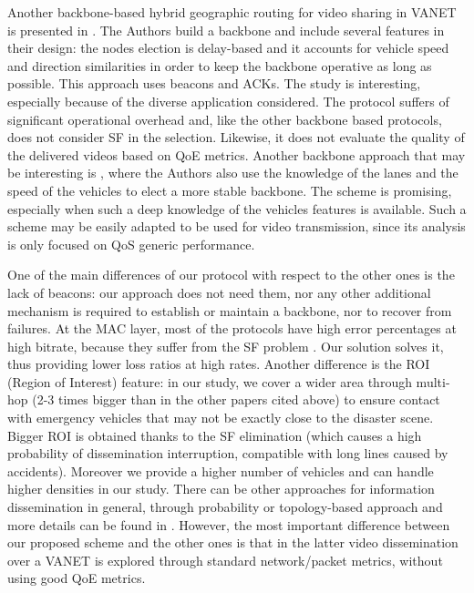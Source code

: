 \documentclass{acm_proc_article-sp}
\begin{document}
Another backbone-based hybrid geographic routing for video sharing in VANET is presented in \cite{VideoBackboneDiFelice}. The Authors build a backbone and include several features in their design: the nodes election is delay-based and it accounts for vehicle speed and direction similarities in order to keep the backbone operative as long as possible. This approach uses beacons and ACKs. The study is interesting, especially because of the diverse application considered. The protocol suffers of significant operational overhead and, like the other backbone based protocols, does not consider SF in the selection.  Likewise, it does not evaluate the quality of the delivered videos based on QoE metrics.
Another backbone approach that may be interesting is \cite{medhocrubin}, where the Authors also use the knowledge of the lanes and the speed of the vehicles to elect a more stable backbone. The scheme is promising, especially when such a deep knowledge of the vehicles features is available. Such a scheme may be easily adapted to be used for video transmission, since its analysis is only focused on QoS generic performance.

One of the main differences of our protocol with respect to the other ones is the lack of beacons: our approach does not need them, nor any other additional mechanism is required to establish or maintain a backbone, nor to recover from failures.
At the MAC layer, most of the protocols have high error percentages at high bitrate, because they suffer from the SF problem \cite{VTCDeFelice}. Our solution solves it, thus providing lower loss ratios at high rates.
Another difference is the ROI (Region of Interest) feature: in our study, we cover a wider area through multi-hop (2-3 times bigger than in the other papers cited above) to ensure contact with emergency vehicles that may not be exactly close to the disaster scene. Bigger ROI is obtained thanks to the SF elimination (which causes a high probability of dissemination interruption, compatible with long lines caused by accidents). Moreover  we provide a higher number of vehicles and can handle higher densities in our study.
There can be other approaches for information dissemination in general, through probability or topology-based approach and more details can be found in \cite{dissemination}. However, the most important difference between our proposed scheme and the other ones is that in the latter video dissemination over a VANET is explored through standard network/packet metrics, without using good QoE metrics.
\end{document}
